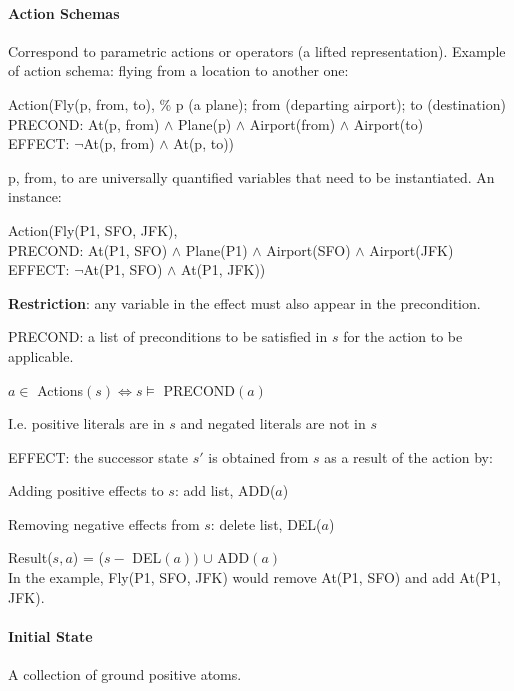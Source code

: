 \documentclass[10pt]{report}
\begin{document}
\paragraph{Action Schemas} Correspond to parametric actions or operators (a lifted representation). Example of action schema: flying from a location to another one:
\begin{list}{}{}
	\item Action(Fly(p, from, to), \% p (a plane); from (departing airport); to (destination)\\
	PRECOND: At(p, from) $\wedge$ Plane(p) $\wedge$ Airport(from) $\wedge$ Airport(to)\\
	EFFECT: $\neg$At(p, from) $\wedge$ At(p, to))
\end{list}
p, from, to are universally quantified variables that need to be instantiated. An instance:
\begin{list}{}{}
	\item Action(Fly(P1, SFO, JFK),\\
	PRECOND: At(P1, SFO) $\wedge$ Plane(P1) $\wedge$ Airport(SFO) $\wedge$ Airport(JFK)\\
	EFFECT: $\neg$At(P1, SFO) $\wedge$ At(P1, JFK))
\end{list}
\textbf{Restriction}: any variable in the effect must also appear in the precondition.
\begin{list}{}{}
	\item PRECOND: a list of preconditions to be satisfied in $s$ for the action to be applicable.
	\begin{list}{}{}
		\item $a \in$ Actions$(s)\Leftrightarrow s\vDash$ PRECOND$(a)$	
	\end{list}
	I.e. positive literals are in $s$ and negated literals are not in $s$
	\item EFFECT: the successor state $s'$ is obtained from $s$ as a result of the action by:\begin{list}{}{}
		\item Adding positive effects to $s$: add list, ADD($a$)
		\item Removing negative effects from $s$: delete list, DEL($a$)
	\end{list}
	Result($s,a$) = ($s-$ DEL$(a))$ $\cup$ ADD$(a)$\\
	In the example, Fly(P1, SFO, JFK) would remove At(P1, SFO) and add At(P1, JFK).
\end{list}
\paragraph{Initial State} A collection of ground positive atoms.
\end{document}

